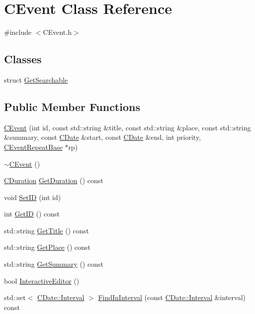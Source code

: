 \hypertarget{class_c_event}{}\section{C\+Event Class Reference}
\label{class_c_event}


{\ttfamily \#include $<$C\+Event.\+h$>$}

\subsection*{Classes}
\begin{DoxyCompactItemize}
\item 
struct \mbox{\hyperlink{struct_c_event_1_1_get_searchable}{Get\+Searchable}}
\end{DoxyCompactItemize}
\subsection*{Public Member Functions}
\begin{DoxyCompactItemize}
\item 
\mbox{\hyperlink{class_c_event_ad374d2c0160476ae18df3cf3673618f8}{C\+Event}} (int id, const std\+::string \&title, const std\+::string \&place, const std\+::string \&summary, const \mbox{\hyperlink{class_c_date}{C\+Date}} \&start, const \mbox{\hyperlink{class_c_date}{C\+Date}} \&end, int priority, \mbox{\hyperlink{class_c_event_repeat_base}{C\+Event\+Repeat\+Base}} $\ast$rp)
\item 
\mbox{\hyperlink{class_c_event_ad088f3ce4e9585ce8fadafb5655511fb}{$\sim$\+C\+Event}} ()
\item 
\mbox{\hyperlink{class_c_duration}{C\+Duration}} \mbox{\hyperlink{class_c_event_ab4618cf318c9f54d538495d563394426}{Get\+Duration}} () const
\item 
void \mbox{\hyperlink{class_c_event_a451862c764badeee1c73db74d93e5d7c}{Set\+ID}} (int id)
\item 
int \mbox{\hyperlink{class_c_event_a59c9565b549ffaca271d4a627171bbde}{Get\+ID}} () const
\item 
std\+::string \mbox{\hyperlink{class_c_event_a745ad8ffd3f5dfb0bf34a4fe9b6de580}{Get\+Title}} () const
\item 
std\+::string \mbox{\hyperlink{class_c_event_a3a69c56877cd35d5b0199656801ddb58}{Get\+Place}} () const
\item 
std\+::string \mbox{\hyperlink{class_c_event_aa29013fcec20a717e1a9b6e8ab302fc9}{Get\+Summary}} () const
\item 
bool \mbox{\hyperlink{class_c_event_ac30388f117bc9681506d9f54e1f4fba8}{Interactive\+Editor}} ()
\item 
std\+::set$<$ \mbox{\hyperlink{class_c_date_af23472c977b14ed341b48183ec19d874}{C\+Date\+::\+Interval}} $>$ \mbox{\hyperlink{class_c_event_af68e8c2b9541d6471bfe75b8c81d2f98}{Find\+In\+Interval}} (const \mbox{\hyperlink{class_c_date_af23472c977b14ed341b48183ec19d874}{C\+Date\+::\+Interval}} \&interval) const
\end{DoxyCompactItemize}
